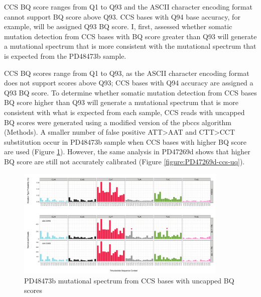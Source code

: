 CCS BQ score ranges from Q1 to Q93 and the ASCII character encoding format cannot support BQ score above Q93. CCS bases with Q94 base accuracy, for example, will be assigned Q93 BQ score. I, first, assessed whether somatic mutation detection from CCS bases with BQ score greater than Q93 will generate a mutational spectrum that is more consistent with the mutational spectrum that is expected from the PD48473b sample. 

CCS BQ scores range from Q1 to Q93, as the ASCII character encoding format does not support scores above Q93; CCS bases with Q94 accuracy are assigned a Q93 BQ score. To determine whether somatic mutation detection from CCS bases BQ score higher than Q93 will generate a mutational spectrum that is more consistent with what is expected from each sample, CCS reads with uncapped BQ scores were generated using a modified version of the pbccs algorithm (Methods). A smaller number of false positive ATT>AAT and CTT>CCT substitution occur in PD48473b sample when CCS bases with higher BQ score are used (Figure \ref{figure:PD48473b-ccs-uq}). However, the same analysis in PD47269d shows that higher BQ score are still not accurately calibrated (Figure \ref{figure:PD47269d-ccs-uq}).

\begin{figure}[htbp!]
\caption{PD48473b mutational spectrum from CCS bases with uncapped BQ scores}
\label{figure:PD48473b-ccs-uq}
\includegraphics[width=0.9\textwidth]{Vector/KX004_PD48473b_ccs_uq.pdf}
\end{figure}


